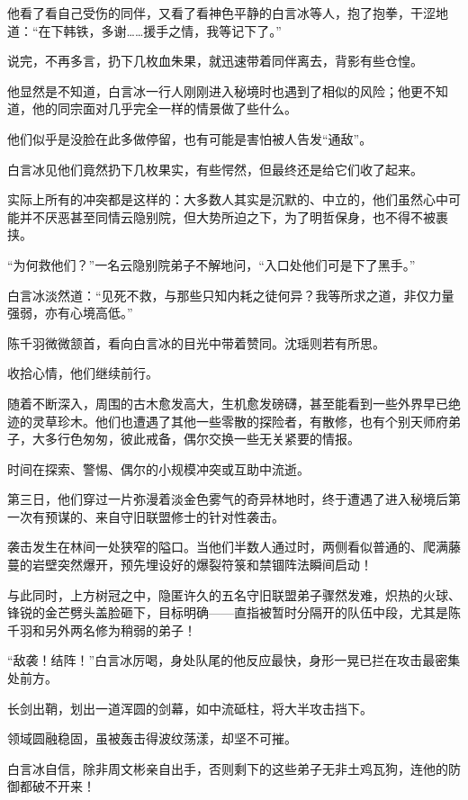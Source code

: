 他看了看自己受伤的同伴，又看了看神色平静的白言冰等人，抱了抱拳，干涩地道：“在下韩铁，多谢……援手之情，我等记下了。”

说完，不再多言，扔下几枚血朱果，就迅速带着同伴离去，背影有些仓惶。

他显然是不知道，白言冰一行人刚刚进入秘境时也遇到了相似的风险；他更不知道，他的同宗面对几乎完全一样的情景做了些什么。

他们似乎是没脸在此多做停留，也有可能是害怕被人告发“通敌”。

白言冰见他们竟然扔下几枚果实，有些愕然，但最终还是给它们收了起来。

实际上所有的冲突都是这样的：大多数人其实是沉默的、中立的，他们虽然心中可能并不厌恶甚至同情云隐别院，但大势所迫之下，为了明哲保身，也不得不被裹挟。

“为何救他们？”一名云隐别院弟子不解地问，“入口处他们可是下了黑手。”

白言冰淡然道：“见死不救，与那些只知内耗之徒何异？我等所求之道，非仅力量强弱，亦有心境高低。”

陈千羽微微颔首，看向白言冰的目光中带着赞同。沈瑶则若有所思。

\vspace{2em}

收拾心情，他们继续前行。

随着不断深入，周围的古木愈发高大，生机愈发磅礴，甚至能看到一些外界早已绝迹的灵草珍木。他们也遭遇了其他一些零散的探险者，有散修，也有个别天师府弟子，大多行色匆匆，彼此戒备，偶尔交换一些无关紧要的情报。

时间在探索、警惕、偶尔的小规模冲突或互助中流逝。

第三日，他们穿过一片弥漫着淡金色雾气的奇异林地时，终于遭遇了进入秘境后第一次有预谋的、来自守旧联盟修士的针对性袭击。

袭击发生在林间一处狭窄的隘口。当他们半数人通过时，两侧看似普通的、爬满藤蔓的岩壁突然爆开，预先埋设好的爆裂符箓和禁锢阵法瞬间启动！

与此同时，上方树冠之中，隐匿许久的五名守旧联盟弟子骤然发难，炽热的火球、锋锐的金芒劈头盖脸砸下，目标明确——直指被暂时分隔开的队伍中段，尤其是陈千羽和另外两名修为稍弱的弟子！

“敌袭！结阵！”白言冰厉喝，身处队尾的他反应最快，身形一晃已拦在攻击最密集处前方。

长剑出鞘，划出一道浑圆的剑幕，如中流砥柱，将大半攻击挡下。

领域圆融稳固，虽被轰击得波纹荡漾，却坚不可摧。

白言冰自信，除非周文彬亲自出手，否则剩下的这些弟子无非土鸡瓦狗，连他的防御都破不开来！

